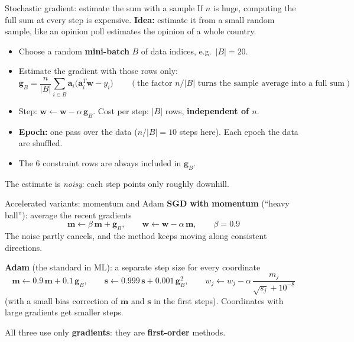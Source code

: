 \documentclass[10pt,aspectratio=169]{beamer}
\newcommand{\hl}[1]{\textcolor{accent}{\textbf{#1}}}
\begin{document}
\begin{frame}{Stochastic gradient: estimate the sum with a sample}
  If $n$ is huge, computing the full sum at every step is expensive.
  \textbf{Idea:} estimate it from a small random sample, like an opinion
  poll estimates the opinion of a whole country.
  \vspace{0.3em}
  \begin{itemize}
    \item Choose a random \hl{mini-batch} $B$ of data indices, e.g.\ $|B| = 20$.
    \item Estimate the gradient with those rows only:
          \[
            \bm{g}_B = \frac{n}{|B|} \sum_{i \in B} \bm{a}_i \big(\bm{a}_i^T \bm{w} - y_i\big)
            \qquad (\text{the factor } n/|B| \text{ turns the sample average into a full sum})
          \]
    \item Step: $\bm{w} \leftarrow \bm{w} - \alpha\, \bm{g}_B$.
          Cost per step: $|B|$ rows, \hl{independent of $n$}.
    \item \textbf{Epoch:} one pass over the data ($n/|B| = 10$ steps here).
          Each epoch the data are shuffled.
    \item The 6 constraint rows are always included in $\bm{g}_B$.
  \end{itemize}
  \vspace{0.3em}
  \small The estimate is \emph{noisy}: each step points only roughly downhill.
\end{frame}

\begin{frame}{Accelerated variants: momentum and Adam}
  \textbf{SGD with momentum} (``heavy ball''): average the recent gradients
  \[
    \bm{m} \leftarrow \beta\,\bm{m} + \bm{g}_B, \qquad
    \bm{w} \leftarrow \bm{w} - \alpha\,\bm{m}, \qquad \beta = 0.9
  \]
  The noise partly cancels, and the method keeps moving along consistent
  directions.
  \vspace{0.5em}

  \textbf{Adam} (the standard in ML): a separate step size for every
  coordinate
  \[
    \bm{m} \leftarrow 0.9\,\bm{m} + 0.1\,\bm{g}_B, \qquad
    \bm{s} \leftarrow 0.999\,\bm{s} + 0.001\,\bm{g}_B^2, \qquad
    w_j \leftarrow w_j - \alpha\, \frac{m_j}{\sqrt{s_j} + 10^{-8}}
  \]
  (with a small bias correction of $\bm{m}$ and $\bm{s}$ in the first steps).
  Coordinates with large gradients get smaller steps.
  \vspace{0.5em}

  All three use only \hl{gradients}: they are \hl{first-order} methods.
\end{frame}
\end{document}
